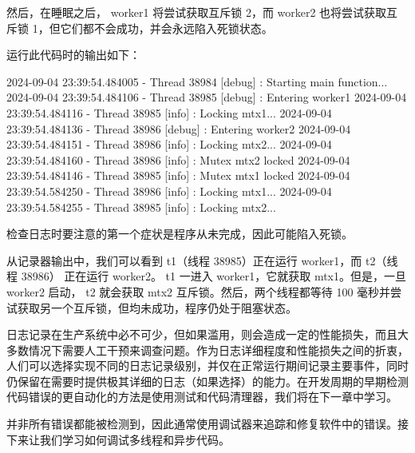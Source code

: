 然后，在睡眠之后， worker1 将尝试获取互斥锁 2，而 worker2 也将尝试获取互斥锁 1，但它们都不会成功，并会永远陷入死锁状态。

运行此代码时的输出如下：

\begin{shell}
2024-09-04 23:39:54.484005 - Thread 38984 [debug] : Starting main
function...
2024-09-04 23:39:54.484106 - Thread 38985 [debug] : Entering worker1
2024-09-04 23:39:54.484116 - Thread 38985 [info] : Locking mtx1...
2024-09-04 23:39:54.484136 - Thread 38986 [debug] : Entering worker2
2024-09-04 23:39:54.484151 - Thread 38986 [info] : Locking mtx2...
2024-09-04 23:39:54.484160 - Thread 38986 [info] : Mutex mtx2 locked
2024-09-04 23:39:54.484146 - Thread 38985 [info] : Mutex mtx1 locked
2024-09-04 23:39:54.584250 - Thread 38986 [info] : Locking mtx1...
2024-09-04 23:39:54.584255 - Thread 38985 [info] : Locking mtx2...
\end{shell}

检查日志时要注意的第一个症状是程序从未完成，因此可能陷入死锁。

从记录器输出中，我们可以看到 t1（线程 38985）正在运行 worker1，而 t2（线程 38986） 正在运行 worker2。 t1 一进入 worker1，它就获取 mtx1。但是，一旦 worker2 启动， t2 就会获取 mtx2 互斥锁。然后，两个线程都等待 100 毫秒并尝试获取另一个互斥锁，但均未成功，程序仍处于阻塞状态。

日志记录在生产系统中必不可少，但如果滥用，则会造成一定的性能损失，而且大多数情况下需要人工干预来调查问题。作为日志详细程度和性能损失之间的折衷，人们可以选择实现不同的日志记录级别，并仅在正常运行期间记录主要事件，同时仍保留在需要时提供极其详细的日志（如果选择）的能力。在开发周期的早期检测代码错误的更自动化的方法是使用测试和代码清理器，我们将在下一章中学习。

并非所有错误都能被检测到，因此通常使用调试器来追踪和修复软件中的错误。接下来让我们学习如何调试多线程和异步代码。





